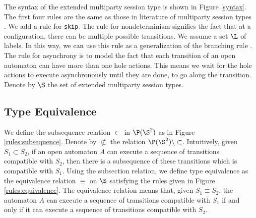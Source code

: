 The syntax of the extended multiparty session type is shown in Figure \ref{syntax}. The first four rules are the same as those in literature of multiparty session types \cite{honda2008multiparty}. We add a rule for \texttt{skip}. The rule for nondeterminism signifies the fact that at a configuration, there can be multiple possible transitions. We assume a set $\L$ of labels. In this way, we can use this rule as a generalization of the branching rule \cite{honda2008multiparty}.  The rule for asynchrony is to model the fact that each transition of an open automaton can have more than one hole actions. This means we wait for the hole actions to execute asynchronously until they are done, to go along the transition. Denote by $\S$ the set of extended multiparty session types.


\subsection{Type Equivalence}

We define the subsequence relation $\subset$ in $\P(\S^2)$ as in Figure \ref{rules:subsequence}. Denote by $\not\subset$ the relation $\P(\S^2)\setminus\subset$. Intuitively, given $S_1\subset S_2$, if an open automaton $A$ can execute a sequence of transitions compatible with $S_2$, then there is a subsequence of these transitions which is compatible with $S_1$. Using the subsection relation, we define type equivalence as the equivalence relation $\equiv$ on $\S$ satisfying the rules given in Figure \ref{rules:equivalence}. The equivalence relation means that, given $S_1\equiv S_2$, the automaton $A$ can execute a sequence of transitions compatible with $S_1$ if and only if it can execute a sequence of transitions compatible with $S_2$.


